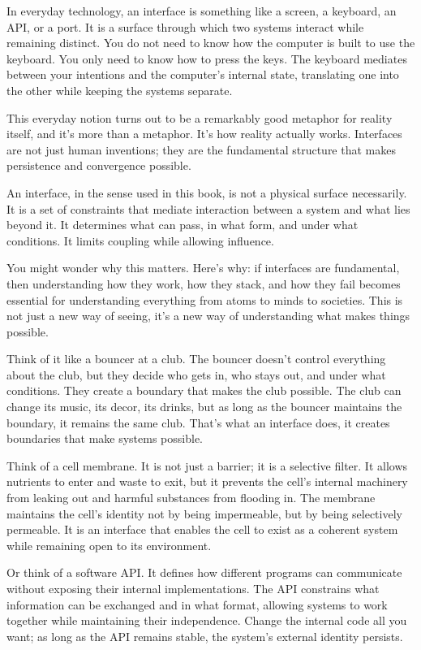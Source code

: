 \documentclass[
  openright]{book}
\begin{document}
In everyday technology, an interface is something like a screen, a
keyboard, an API, or a port. It is a surface through which two systems
interact while remaining distinct. You do not need to know how the
computer is built to use the keyboard. You only need to know how to
press the keys. The keyboard mediates between your intentions and the
computer's internal state, translating one into the other while keeping
the systems separate.

This everyday notion turns out to be a remarkably good metaphor for
reality itself, and it's more than a metaphor. It's how reality actually
works. Interfaces are not just human inventions; they are the
fundamental structure that makes persistence and convergence possible.

An interface, in the sense used in this book, is not a
physical surface necessarily. It is a set of
constraints that mediate interaction between a system
and what lies beyond it. It determines what can pass, in what form, and
under what conditions. It limits coupling while allowing influence.

You might wonder why this matters. Here's why: if interfaces are
fundamental, then understanding how they work, how they
stack, and how they fail becomes essential for
understanding everything from atoms to minds to societies. This is not
just a new way of seeing, it's a new way of understanding what makes
things possible.

Think of it like a bouncer at a club. The bouncer doesn't control
everything about the club, but they decide who gets in, who stays out,
and under what conditions. They create a boundary that makes the club
possible. The club can change its music, its decor, its drinks, but as
long as the bouncer maintains the boundary, it remains the same club.
That's what an interface does, it creates boundaries that make systems
possible.

Think of a cell membrane. It is not just a barrier; it is a selective
filter. It allows nutrients to enter and waste to exit, but it prevents
the cell's internal machinery from leaking out and harmful substances
from flooding in. The membrane maintains the cell's identity not by
being impermeable, but by being selectively permeable. It is an
interface that enables the cell to exist as a coherent system while
remaining open to its environment.

Or think of a software API. It defines how different programs can
communicate without exposing their internal implementations. The API
constrains what information can be exchanged and in what format,
allowing systems to work together while maintaining their independence.
Change the internal code all you want; as long as the API remains
stable, the system's external identity persists.
\end{document}
